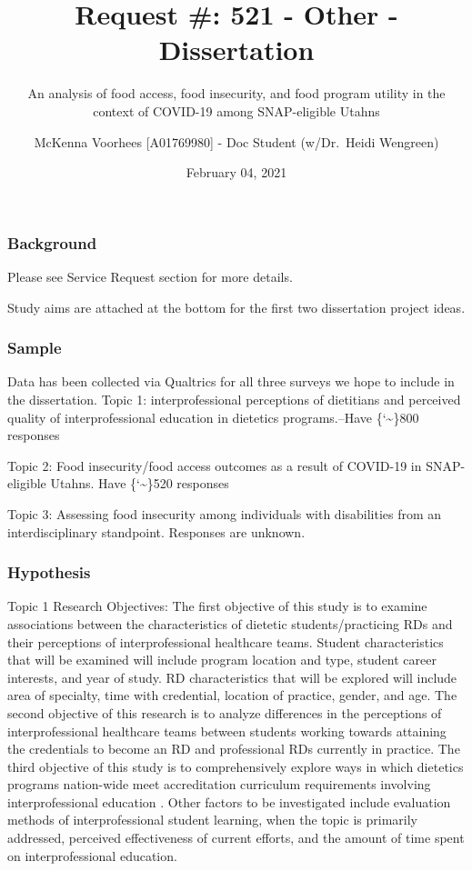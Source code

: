 \documentclass[
]{article}
\title{Request \#: 521 - Other - Dissertation}
\subtitle{An analysis of food access, food insecurity, and food program
utility in the context of COVID-19 among SNAP-eligible Utahns}
\author{McKenna Voorhees {[}A01769980{]} - Doc Student (w/Dr.~Heidi
Wengreen)}
\date{February 04, 2021}
\begin{document}
\maketitle

\hypertarget{background}{%
\subsubsection{Background}\label{background}}

Please see Service Request section for more details.

Study aims are attached at the bottom for the first two dissertation
project ideas.

\hypertarget{sample}{%
\subsubsection{Sample}\label{sample}}

Data has been collected via Qualtrics for all three surveys we hope to
include in the dissertation. Topic 1: interprofessional perceptions of
dietitians and perceived quality of interprofessional education in
dietetics programs.--Have \{\char`\textasciitilde\}800 responses

Topic 2: Food insecurity/food access outcomes as a result of COVID-19 in
SNAP-eligible Utahns. Have \{\char`\textasciitilde\}520 responses

Topic 3: Assessing food insecurity among individuals with disabilities
from an interdisciplinary standpoint. Responses are unknown.

\hypertarget{hypothesis}{%
\subsubsection{Hypothesis}\label{hypothesis}}

Topic 1 Research Objectives: The first objective of this study is to
examine associations between the characteristics of dietetic
students/practicing RDs and their perceptions of interprofessional
healthcare teams. Student characteristics that will be examined will
include program location and type, student career interests, and year of
study. RD characteristics that will be explored will include area of
specialty, time with credential, location of practice, gender, and age.
The second objective of this research is to analyze differences in the
perceptions of interprofessional healthcare teams between students
working towards attaining the credentials to become an RD and
professional RDs currently in practice. The third objective of this
study is to comprehensively explore ways in which dietetics programs
nation-wide meet accreditation curriculum requirements involving
interprofessional education . Other factors to be investigated include
evaluation methods of interprofessional student learning, when the topic
is primarily addressed, perceived effectiveness of current efforts, and
the amount of time spent on interprofessional education.
\end{document}
